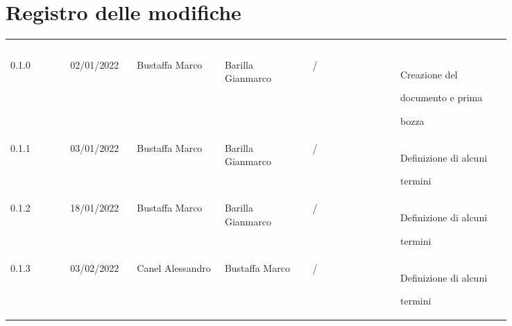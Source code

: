\section*{Registro delle modifiche}

{\renewcommand{\arraystretch}{1.5}
\scriptsize
\begin{tabular}{p{0.10\linewidth}p{0.10\linewidth}p{0.15\linewidth}p{0.15\linewidth}p{0.15\linewidth}p{0.19\linewidth}}
	\rowcolor[RGB]{33, 73, 50}
	\textcolor{white}{\textbf{Versione}} & \textcolor{white}{\textbf{Data}} &
	\textcolor{white}{\textbf{Redattore}} & \textcolor{white}{\textbf{Verificatore}} &
	\textcolor{white}{\textbf{Approvatore}} & \textcolor{white}{\textbf{Descrizione}}\\
	\rowcolor[RGB]{216, 235, 171}
	0.1.0 & 02/01/2022 & Bustaffa Marco & Barilla Gianmarco &/& Creazione del \par documento  e prima \par bozza\\
	\rowcolor[RGB]{233, 245, 206}
	0.1.1 & 03/01/2022 & Bustaffa Marco & Barilla Gianmarco &/& Definizione di alcuni \par termini\\
	\rowcolor[RGB]{216, 235, 171}
	0.1.2 & 18/01/2022 & Bustaffa Marco & Barilla Gianmarco &/& Definizione di alcuni \par termini\\
	\rowcolor[RGB]{233, 245, 206}
	0.1.3 & 03/02/2022 & Canel Alessandro & Bustaffa Marco &/& Definizione di alcuni \par termini\\
\end{tabular}
}
